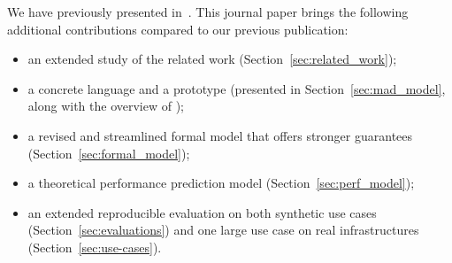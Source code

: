 We have previously presented \mad in~\cite{chardet:hal-01858150}. This
journal paper brings the following additional contributions compared
to our previous publication:
\begin{itemize}
\item an extended study of the related work (Section~\ref{sec:related_work});
\item a concrete language and a prototype (presented in
  Section~\ref{sec:mad_model}, along with the overview of \mad);
\item a revised and streamlined formal model that offers stronger
  guarantees (Section~\ref{sec:formal_model});
\item a theoretical performance prediction model
  (Section~\ref{sec:perf_model});
\item an extended reproducible evaluation on both synthetic use cases
  (Section~\ref{sec:evaluations}) and one large use case on real
  infrastructures (Section~\ref{sec:use-cases}).
\end{itemize}





